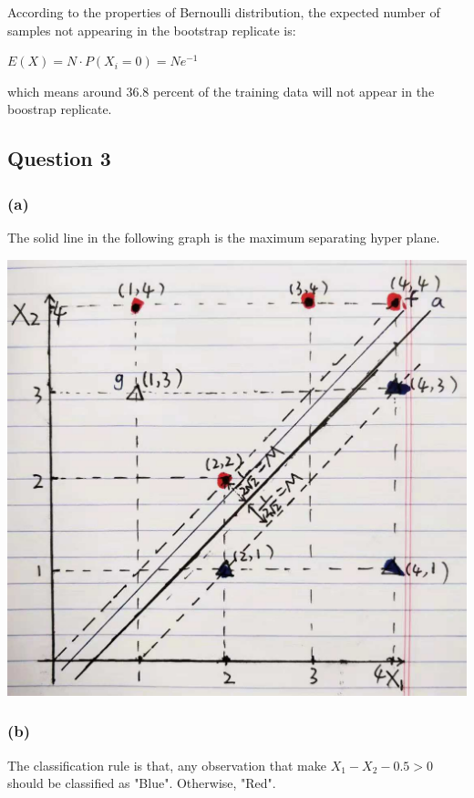 \documentclass[12pt]{article}
\begin{document}
{According to the properties of Bernoulli distribution, the expected number of samples not appearing in the bootstrap replicate  is: 
\begin{center}
$E(X)= N\cdot P(X_{i}=0) = Ne^{-1} $
\end{center}

which means around 36.8 percent of the training data will not appear in the boostrap replicate. 

\subsection*{Question 3}
\subsubsection*{(a)}
The solid line in the following graph is the maximum separating hyper plane. 
\begin{center}
\includegraphics[scale=0.3]{max_margin_classifier.jpg}
\end{center}

\subsubsection*{(b)}
The classification rule is that, any observation that make $X_{1}-X_{2}-0.5 > 0$ should be classified as "Blue". Otherwise, "Red". 

}
\end{document}
